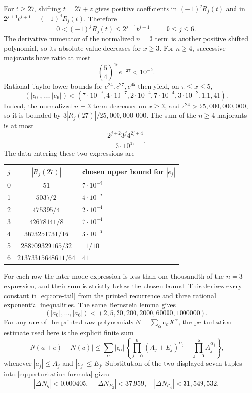 \documentclass[11pt]{article}
\theoremstyle{remark}
\newcommand{\Cfour}{\mathcal{C}_4}
\numberwithin{equation}{section}
\begin{document}
For \(t\geq27\), shifting \(t=27+z\) gives positive coefficients in
\((-1)^jR_j(t)\) and in
\(2^{j+1}t^{j+1}-(-1)^jR_j(t)\). Therefore
\begin{equation}\label{eq:R-envelope}
 0<(-1)^jR_j(t)\leq2^{j+1}t^{j+1},
 \qquad 0\leq j\leq6.
\end{equation}
The derivative numerator of the normalized \(n=3\) term is another positive
shifted polynomial, so its absolute value decreases for \(x\geq3\). For
\(n\geq4\), successive majorants have ratio at most
\[
 \left(\frac54\right)^{16}e^{-27}<10^{-9}.
\]
Rational Taylor lower bounds for \(e^{24},e^{27},e^{45}\) then yield, on
\(\pi\leq x\leq5\),
\begin{equation}\label{eq:core-tail}
(|e_0|,\ldots,|e_6|)<
(7\!\cdot\!10^{-9},4\!\cdot\!10^{-7},2\!\cdot\!10^{-4},
7\!\cdot\!10^{-4},3\!\cdot\!10^{-2},1.1,41).
\end{equation}
Indeed, the normalized \(n=3\) term decreases on \(x\geq3\), and
\(e^{24}>25{,}000{,}000{,}000\), so it is bounded by
\(3|R_j(27)|/25{,}000{,}000{,}000\). The sum of the \(n\geq4\) majorants is
at most
\[
 \frac{2^{j+2}3^j4^{2j+4}}{3\cdot10^{19}}.
\]
The data entering these two expressions are
\begin{center}
\small
\begin{tabular}{@{}ccl@{}}
\toprule
\(j\) & \( |R_j(27)| \) & chosen upper bound for \( |e_j| \)\\
\midrule
0 & \(51\) & \(7\cdot10^{-9}\)\\
1 & \(5037/2\) & \(4\cdot10^{-7}\)\\
2 & \(475395/4\) & \(2\cdot10^{-4}\)\\
3 & \(42678141/8\) & \(7\cdot10^{-4}\)\\
4 & \(3623251731/16\) & \(3\cdot10^{-2}\)\\
5 & \(288709329165/32\) & \(11/10\)\\
6 & \(21373315648611/64\) & \(41\)\\
\bottomrule
\end{tabular}
\end{center}
For each row the later-mode expression is less than one thousandth of the
\(n=3\) expression, and their sum is strictly below the chosen bound. This
derives every constant in \eqref{eq:core-tail} from the printed recurrence and
three rational exponential inequalities.
The same Bernstein lemma gives
\[
(|a_0|,\ldots,|a_6|)<(2,5,20,200,2000,60000,1000000).
\]
For any one of the printed raw polynomials
\(N=\sum_\alpha c_\alpha X^\alpha\), the perturbation estimate used here is
the explicit finite sum
\begin{equation}\label{eq:perturbation-formula}
 |N(a+e)-N(a)|
 \leq\sum_\alpha |c_\alpha|
 \left\{\prod_{j=0}^6(A_j+E_j)^{\alpha_j}
              -\prod_{j=0}^6A_j^{\alpha_j}\right\},
\end{equation}
whenever \(|a_j|\leq A_j\) and \(|e_j|\leq E_j\). Substitution of the two
displayed seven-tuples into \eqref{eq:perturbation-formula} gives
\begin{equation}\label{eq:core-perturbation}
 |\Delta N_q|<0.000405,\quad
 |\Delta N_{F_2}|<37.959,\quad
 |\Delta N_{\Cfour}|<31{,}549{,}532.
\end{equation}
\end{document}
